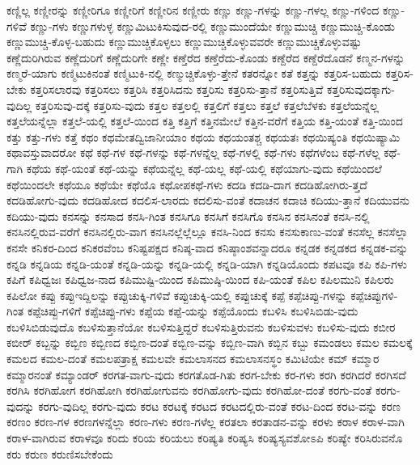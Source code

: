 {ಕಣ್ಣಿಲ್ಲ
ಕಣ್ಣೀರನ್ನು
ಕಣ್ಣೀರಿಗೂ
ಕಣ್ಣೀರಿಗೆ
ಕಣ್ಣೀರಿನ
ಕಣ್ಣೀರು
ಕಣ್ಣು
ಕಣ್ಣು-ಗಳನ್ನು
ಕಣ್ಣು-ಗಳಲ್ಲ
ಕಣ್ಣು-ಗಳಿಂದ
ಕಣ್ಣು-ಗಳಿವೆ
ಕಣ್ಣು-ಗಳು
ಕಣ್ಣುಗಳುಳ್ಳ
ಕಣ್ಣುಮಿಟುಕಿಸುವುದ-ರಲ್ಲಿ
ಕಣ್ಣುಮುಂದೆಯೇ
ಕಣ್ಣುಮುಚ್ಚಿ
ಕಣ್ಣುಮುಚ್ಚಿ-ಕೊಂಡು
ಕಣ್ಣುಮುಚ್ಚಿ-ಕೊಳ್ಳ-ಬಹುದು
ಕಣ್ಣುಮುಚ್ಚಿಕೊಳ್ಳಲು
ಕಣ್ಣುಮುಚ್ಚಿಕೊಳ್ಳುವವರೇ
ಕಣ್ಣುಮುಚ್ಚಿಕೊಳ್ಳುವಷ್ಟು
ಕಣ್ಣೆದುರಿಗಿರುವ
ಕಣ್ಣೆದುರಿಗೆ
ಕಣ್ಣೆದುರಿಗೇ
ಕಣ್ಣೇ
ಕಣ್ತೆರೆದ
ಕಣ್ತೆರೆದು-ಕೊಂಡು
ಕಣ್ದೆರೆದ
ಕಣ್ದೆರೆದೊಡನೆ
ಕಣ್ಮನ-ಗಳನ್ನು
ಕಣ್ಮರೆ-ಯಾಗು
ಕಣ್ಮಿಟುಕಿನಂತೆ
ಕಣ್ಮಿಟುಕಿ-ನಲ್ಲಿ
ಕಣ್ಮುಚ್ಚಿಕೊಳ್ಳು-ತ್ತೇನೆ
ಕತರನ್ನೋ
ಕತೆ
ಕತ್ತನ್ನು
ಕತ್ತರಿಸ-ಬಹುದು
ಕತ್ತರಿಸ-ಬೇಕು
ಕತ್ತರಿಸಲಾರವು
ಕತ್ತರಿಸಲು
ಕತ್ತರಿಸಿ
ಕತ್ತರಿಸಿದನು
ಕತ್ತರಿಸು
ಕತ್ತರಿಸು-ತ್ತಾನೆ
ಕತ್ತರಿಸುತ್ತಿವೆ
ಕತ್ತರಿಸುವುದಕ್ಕಾಗು-ವುದಿಲ್ಲ
ಕತ್ತರಿಸುವು-ದಕ್ಕೆ
ಕತ್ತರಿಸು-ವುದು
ಕತ್ತಲ
ಕತ್ತಲಲ್ಲಿ
ಕತ್ತಲಿಗೆ
ಕತ್ತಲು
ಕತ್ತಲೆ
ಕತ್ತಲೆಬೆಳಕು
ಕತ್ತಲೆಯನ್ನೆಲ್ಲ
ಕತ್ತಲೆಯನ್ನೆಲ್ಲಾ
ಕತ್ತಲೆ-ಯಲ್ಲಿ
ಕತ್ತಲೆ-ಯಿಂದ
ಕತ್ತಿ
ಕತ್ತಿಗೆ
ಕತ್ತಿನಮೇಲೆ
ಕತ್ತಿನ-ವರೆಗೆ
ಕತ್ತಿಯ
ಕತ್ತಿ-ಯಂತೆ
ಕತ್ತಿ-ಯಿಂದ
ಕತ್ತು
ಕತ್ತು-ಗಳು
ಕತ್ತೆ
ಕಥಂ
ಕಥಮೇತದ್ವಿಜಾನೀಯಾಂ
ಕಥಯ
ಕಥಯಂತಶ್ಚ
ಕಥಯತಃ
ಕಥಯಿಷ್ಯಂತಿ
ಕಥಯಿಷ್ಯಾಮಿ
ಕಥಾವಸ್ತುವಾದರೋ
ಕಥೆ
ಕಥೆ-ಗಳ
ಕಥೆ-ಗಳನ್ನು
ಕಥೆ-ಗಳನ್ನೆಲ್ಲ
ಕಥೆ-ಗಳಲ್ಲಿ
ಕಥೆ-ಗಳು
ಕಥೆಗಳೆಂಬ
ಕಥೆ-ಗಳೆಲ್ಲ
ಕಥೆ-ಗಾಗಿ
ಕಥೆಯ
ಕಥೆ-ಯಂತೆ
ಕಥೆ-ಯನ್ನು
ಕಥೆಯನ್ನೆಲ್ಲ
ಕಥೆ-ಯಲ್ಲ
ಕಥೆ-ಯಲ್ಲಿ
ಕಥೆಯಾಗು-ವುದು
ಕಥೆಯಿಂದಲೆ
ಕಥೆಯಿಂದಲೇ
ಕಥೆಯೂ
ಕಥೆಯೇ
ಕಥೆಯೊ
ಕಥೋಪಕಥೆ-ಗಳು
ಕದಡಿ
ಕದಡಿ-ದಾಗ
ಕದಡಿಹೋಗಿರು-ತ್ತದೆ
ಕದಡಿಹೋಗು-ವುದು
ಕದಡಿಹೋದ
ಕದಲಿಸ-ಲಾರದು
ಕದಲಿಸು-ವಂತೆ
ಕದಾಚನ
ಕದಾಚಿ
ಕದಿಯು-ತ್ತಾನೆ
ಕದಿಯುವನು
ಕದಿಯು-ವುದು
ಕನಸನ್ನು
ಕನಸಾದ
ಕನಸಿ-ಗಿಂತ
ಕನಸಿಗೂ
ಕನಸಿಗೆ
ಕನಸಿಗೊ
ಕನಸಿನ
ಕನಸಿನಂತೆ
ಕನಸಿ-ನಲ್ಲಿ
ಕನಸಿನಲ್ಲಿರುವ-ವರೆಗೆ
ಕನಸಿನಲ್ಲಿರು-ವಾಗ
ಕನಸಿನಲ್ಲೆಲ್ಲೆಲ್ಲೂ
ಕನಸಿ-ನಿಂದ
ಕನಸು
ಕನಸುಕಾಣು-ವಂತೆ
ಕನಸೆಲ್ಲ
ಕನಸೆಲ್ಲಾ
ಕನಸೇ
ಕನಿಕರ-ದಿಂದ
ಕನಿಕರವೆಂಬ
ಕನಿಷ್ಟಪಕ್ಷದ
ಕನಿಷ್ಠ-ವಾದ
ಕನಿಷ್ಠಾಂಶವನ್ನಾದರೂ
ಕನ್ನಡಕ
ಕನ್ನಡಕದ
ಕನ್ನಡಕ-ವನ್ನು
ಕನ್ನಡಿ
ಕನ್ನಡಿಯ
ಕನ್ನಡಿ-ಯಂತೆ
ಕನ್ನಡಿ-ಯನ್ನು
ಕನ್ನಡಿ-ಯಲ್ಲಿ
ಕನ್ನಡಿ-ಯಾಗಿ
ಕನ್ನಡಿಯೊಂದು
ಕಪಟವೂ
ಕಪಿ
ಕಪಿ-ಗಳು
ಕಪಿಗೆ
ಕಪಿಧ್ವಜಃ
ಕಪಿಧ್ವಜ-ನಾದ
ಕಪಿಮುಷ್ಟಿ-ಯಿಂದ
ಕಪಿಮುಷ್ಠಿ-ಯಿಂದ
ಕಪಿ-ಯಂತೆ
ಕಪಿಲ
ಕಪಿಲಮುನಿ
ಕಪಿಲರು
ಕಪಿಲೋ
ಕಪ್ಪು
ಕಪ್ಪುಇದ್ದಿಲನ್ನು
ಕಪ್ಪುಚುಕ್ಕಿ-ಗಳಿವೆ
ಕಪ್ಪುಚುಕ್ಕಿ-ಯಲ್ಲಿ
ಕಪ್ಪುಚುಕ್ಕೆ
ಕಪ್ಪೆ
ಕಪ್ಪೆಚಿಪ್ಪು-ಗಳನ್ನು
ಕಪ್ಪೆಚಿಪ್ಪುಗಳಿ-ಗಿಂತ
ಕಪ್ಪೆಚಿಪ್ಪು-ಗಳಿಗೆ
ಕಪ್ಪೆಚಿಪ್ಪು-ಗಳು
ಕಪ್ಪೆಯ
ಕಪ್ಪೆ-ಯನ್ನು
ಕಪ್ಪೆಯೊಂದು
ಕಬಳಿಸಿ
ಕಬಳಿಸಿಬಿಡು-ವುದು
ಕಬಳಿಸಿಬಿಡುವುದೊ
ಕಬಳಿಸುತ್ತಾನೆಯೋ
ಕಬಳಿಸುತ್ತಿದ್ದರೆ
ಕಬಳಿಸುತ್ತಿರುವನು
ಕಬಳಿಸುವಳು
ಕಬಳಿಸು-ವುದು
ಕಬೀರ
ಕಬೀರ್
ಕಬ್ಬನ್ನು
ಕಬ್ಬಿಣ
ಕಬ್ಬಿಣದ
ಕಬ್ಬಿಣ-ದಂತೆ
ಕಬ್ಬಿಣ-ವನ್ನು
ಕಬ್ಬಿಣ-ವಾಗಿ
ಕಬ್ಬಿನ
ಕಬ್ಬು
ಕಮಂಡಲು
ಕಮಲ
ಕಮಲಕ್ಕೆ
ಕಮಲದ
ಕಮಲ-ದಂತೆ
ಕಮಲಪತ್ರಾಕ್ಷ
ಕಮಲವೇ
ಕಮಲಾಸನದ
ಕಮಲಾಸನಸ್ಥಂ
ಕಮಿಟಿಯೇ
ಕಮ್
ಕಮ್ಮಾರ
ಕಮ್ಮಾರನಂತೆ
ಕಮ್ಯಾಂಡರ್
ಕರಗತ-ವಾಗು-ವುದು
ಕರಗತೊಡ-ಗಿತು
ಕರಗ-ಬೇಕು
ಕರ-ಗಳು
ಕರಗಿ
ಕರಗಿದರೆ
ಕರಗಿಸದೆ
ಕರಗಿಸಿ
ಕರಗಿಹೋಗ
ಕರಗಿಹೋಗಿ
ಕರಗಿಹೋಗುವನು
ಕರಗಿಹೋಗು-ವುದು
ಕರಗಿಹೋ-ದಂತೆ
ಕರಗು-ವಂತೆ
ಕರಗು-ವುದನ್ನು
ಕರಗು-ವುದಿಲ್ಲ
ಕರಗು-ವುದು
ಕರಟ
ಕರಟಕ್ಕೆ
ಕರಟದ
ಕರಟದಲ್ಲಿರು-ವಂತೆ
ಕರಟ-ದಿಂದ
ಕರಟ-ವನ್ನು
ಕರಣ
ಕರಣಂ
ಕರಣ-ಗಳ
ಕರಣಗಳನ್ನೆಲ್ಲಾ
ಕರಣ-ಗಳು
ಕರಣ-ಗಳೆಲ್ಲ
ಕರತಲಾ
ಕರತಾಡನ-ವನ್ನು
ಕರಳು
ಕರಾಳ
ಕರಾಳ-ವಾಗಿ
ಕರಾಳ-ವಾಗಿರುವ
ಕರಾಳವೂ
ಕರಿದು
ಕರಿಯ
ಕರಿಯಲು
ಕರಿಷ್ಯತಿ
ಕರಿಷ್ಯಸಿ
ಕರಿಷ್ಯಸ್ಯವಶೋಽಪಿ
ಕರಿಷ್ಯೇ
ಕರಿಸಿರುವನೊ
ಕರು
ಕರುಣ
ಕರುಣಿಸಬೇಕೆಂದು
}
